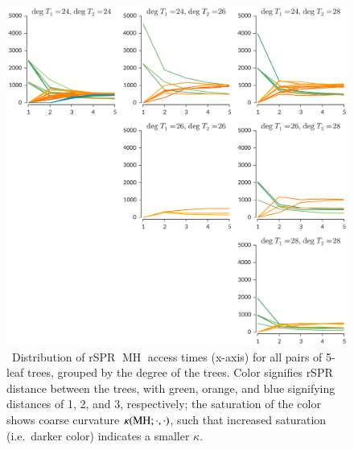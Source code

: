 \documentclass[]{elsarticle}
\let\MYoriglatexcaption\caption
\renewcommand{\caption}[2][\relax]{\MYoriglatexcaption[#2]{#2}}
\newcommand{\MH}{\operatorname{MH}}
\newcommand{\curvature}[2][]{%
    \ifthenelse{\equal{#1}{}}%
		{\kappa(#2)}%
		{\kappa_{#1}(#2)}%
}
\begin{document}
\begin{figure}
	\includegraphics[width=\textwidth]{figs/access5-distribution.png}

	\caption{\
        Distribution of rSPR $\MH$ access times (x-axis) for all pairs of 5-leaf trees, grouped by the degree of the trees.
				Color signifies rSPR distance between the trees, with green, orange, and blue signifying distances of 1, 2, and 3, respectively; the saturation of the color shows coarse curvature $\curvature{\MH; \cdot, \cdot}$, such that increased saturation (i.e.\ darker color) indicates a smaller $\kappa$.
	}
	\label{fig:kappa-access-distribution}
\end{figure}
\end{document}
